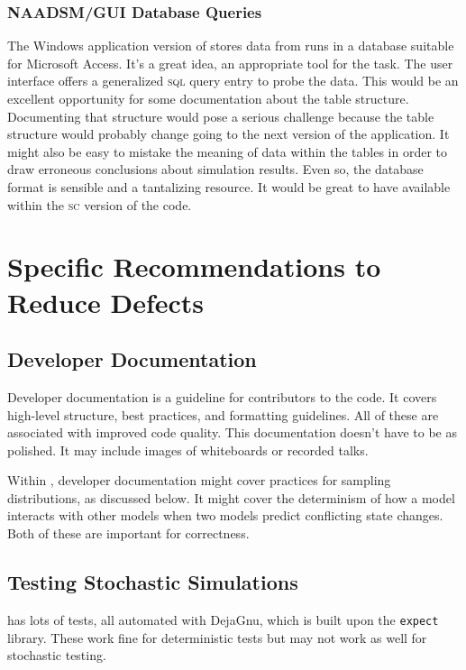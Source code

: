 \documentclass{article}
\begin{document}
\subsubsection{NAADSM/GUI Database Queries}
The Windows application version of \naadsm stores data
from runs in a database suitable for Microsoft Access.
It's a great idea, an appropriate tool for the task.
The user interface offers a generalized \textsc{sql}
query entry to probe the data. This would be an excellent
opportunity for some documentation about the table
structure. Documenting that structure would pose a
serious challenge because the table structure would probably
change going to the next version of the application.
It might also be easy to mistake the meaning of data
within the tables in order to draw erroneous conclusions
about simulation results. Even so, the database format
is sensible and a tantalizing resource. It would be
great to have available within the \textsc{sc} version
of the code.


\section{Specific Recommendations to Reduce Defects}
\subsection{Developer Documentation}

Developer documentation is a guideline for contributors
to the code. It covers high-level structure, best practices,
and formatting guidelines. All of these are associated with
improved code quality. This documentation doesn't have to be
as polished. It may include images of whiteboards or recorded
talks.

Within \naadsm, developer documentation might cover practices
for sampling distributions, as discussed below. It might cover
the determinism of how a model interacts with other models
when two models predict conflicting state changes. Both of these
are important for correctness.


\subsection{Testing Stochastic Simulations}

\naadsm has lots of tests, all automated with DejaGnu, which is
built upon the \texttt{expect} library. These work fine for
deterministic tests but may not work as well for stochastic
testing.
\end{document}
